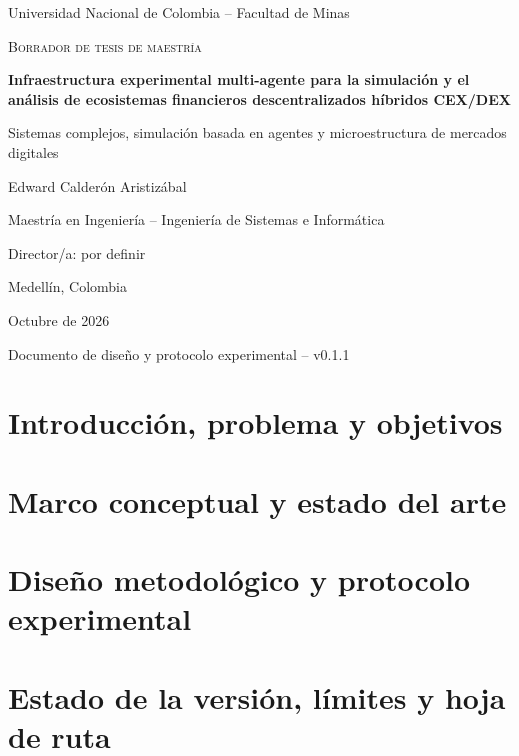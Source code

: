 \documentclass[12pt,oneside,letterpaper]{report}
\newcommand{\tituloTesis}{Infraestructura experimental multi-agente para la simulación y el análisis de ecosistemas financieros descentralizados híbridos CEX/DEX}
\newcommand{\autorTesis}{Edward Calderón Aristizábal}
\newcommand{\programaTesis}{Maestría en Ingeniería -- Ingeniería de Sistemas e Informática}
\newcommand{\universidadTesis}{Universidad Nacional de Colombia -- Facultad de Minas}
\newcommand{\versionTesis}{v0.1.1}
\newcommand{\fechaTesis}{Octubre de 2026}
\begin{document}

\begin{titlepage}
  \centering
  \vspace*{2.0cm}
  {\Large \universidadTesis\par}
  \vspace{2.2cm}
  {\Large \textsc{Borrador de tesis de maestría}\par}
  \vspace{0.8cm}
  {\Huge\bfseries \tituloTesis\par}
  \vspace{1.1cm}
  {\large Sistemas complejos, simulación basada en agentes y microestructura de mercados digitales\par}
  \vfill
  {\Large \autorTesis\par}
  \vspace{0.45cm}
  {\large \programaTesis\par}
  \vspace{0.45cm}
  {\large Director/a: por definir\par}
  \vfill
  {\large Medellín, Colombia\par}
  {\large \fechaTesis\par}
  \vspace{0.35cm}
  {\small Documento de diseño y protocolo experimental -- \versionTesis\par}
\end{titlepage}


\tableofcontents
\clearpage
{}

\chapter{Introducción, problema y objetivos}


\chapter{Marco conceptual y estado del arte}


\chapter{Diseño metodológico y protocolo experimental}


\chapter{Estado de la versión, límites y hoja de ruta}

\end{document}
